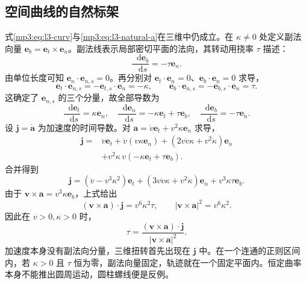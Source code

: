 \documentclass[11pt,openany,fontset=fandol]{ctexbook}
\theoremstyle{definition}\newtheorem{example}{例}[chapter]\newtheorem{exercise}{习题}[chapter]
\newcommand{\dd}{\mathop{}\!\mathrm d}\newcommand{\ee}{\mathrm e}\newcommand{\vct}[1]{\bm{#1}}
\begin{document}
\subsection{空间曲线的自然标架}
式\eqref{mp3:eq:l3-curv}与\eqref{mp3:eq:l3-natural-a}在三维中仍成立。在 $\kappa\ne0$ 处定义副法向量
$\vct e_b=\vct e_t\times\vct e_n$。副法线表示局部密切平面的法向，其转动用挠率 $\tau$ 描述：
\[
\frac{\dd\vct e_b}{\dd s}=-\tau\vct e_n.
\]
由单位长度可知 $\vct e_n\cdot\vct e_{n,s}=0$。再分别对 $\vct e_t\cdot\vct e_n=0$、$\vct e_b\cdot\vct e_n=0$ 求导，
\[
\vct e_t\cdot\vct e_{n,s}=-\vct e_{t,s}\cdot\vct e_n=-\kappa,
\qquad
\vct e_b\cdot\vct e_{n,s}=-\vct e_{b,s}\cdot\vct e_n=\tau.
\]
这确定了 $\vct e_{n,s}$ 的三个分量，故全部导数为
\[
\frac{\dd\vct e_t}{\dd s}=\kappa\vct e_n,\quad
\frac{\dd\vct e_n}{\dd s}=-\kappa\vct e_t+\tau\vct e_b,\quad
\frac{\dd\vct e_b}{\dd s}=-\tau\vct e_n.
\]
设 $\vct j=\dot{\vct a}$ 为加速度的时间导数。对 $\vct a=\dot v\vct e_t+v^2\kappa\vct e_n$ 求导，
\[
\begin{aligned}
\vct j={}&\ddot v\vct e_t+\dot v(v\kappa\vct e_n)
+(2v\dot v\kappa+v^2\dot\kappa)\vct e_n\\
&+v^2\kappa\,v(-\kappa\vct e_t+\tau\vct e_b).
\end{aligned}
\]
合并得到
\[
\vct j=(\ddot v-v^3\kappa^2)\vct e_t
+(3v\dot v\kappa+v^2\dot\kappa)\vct e_n
+v^3\kappa\tau\vct e_b.
\]
由于 $\vct v\times\vct a=v^3\kappa\vct e_b$，上式给出
\[
(\vct v\times\vct a)\cdot\vct j=v^6\kappa^2\tau,
\qquad |\vct v\times\vct a|^2=v^6\kappa^2.
\]
因此在 $v>0,\kappa>0$ 时，
\begin{equation}\label{mp3:eq:l3-torsion}
\tau=\frac{(\vct v\times\vct a)\cdot\vct j}{|\vct v\times\vct a|^2}.
\end{equation}
加速度本身没有副法向分量，三维扭转首先出现在 $\vct j$ 中。在一个连通的正则区间内，若 $\kappa>0$ 且 $\tau$ 恒为零，副法向量固定，轨迹就在一个固定平面内。恒定曲率本身不能推出圆周运动，圆柱螺线便是反例。
\end{document}
